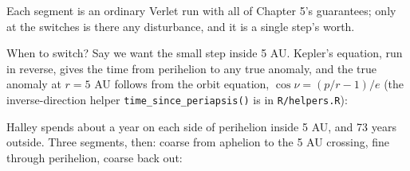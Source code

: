 \documentclass[
  10.5pt,
  letterpaper,
]{scrbook}
\newenvironment{Shaded}{\begin{snugshade}}{\end{snugshade}}
\newcommand{\AttributeTok}[1]{\textcolor[rgb]{0.00,0.00,0.00}{#1}}
\newcommand{\CommentTok}[1]{\textcolor[rgb]{0.00,0.00,0.00}{\textit{#1}}}
\newcommand{\DecValTok}[1]{\textcolor[rgb]{0.00,0.00,0.00}{#1}}
\newcommand{\FunctionTok}[1]{\textcolor[rgb]{0.00,0.00,0.00}{#1}}
\newcommand{\NormalTok}[1]{\textcolor[rgb]{0.00,0.00,0.00}{#1}}
\newcommand{\OtherTok}[1]{\textcolor[rgb]{0.00,0.00,0.00}{#1}}
\newcommand{\SpecialCharTok}[1]{\textcolor[rgb]{0.00,0.00,0.00}{#1}}
\theoremstyle{definition}
\theoremstyle{plain}
\theoremstyle{remark}
\begin{document}
Each segment is an ordinary Verlet run with all of Chapter 5's
guarantees; only at the switches is there any disturbance, and it is a
single step's worth.

When to switch? Say we want the small step inside 5 AU. Kepler's
equation, run in reverse, gives the time from perihelion to any true
anomaly, and the true anomaly at \(r = 5\) AU follows from the orbit
equation, \(\cos\nu = (p/r - 1)/e\) (the inverse-direction helper
\texttt{time\_since\_periapsis()} is in \texttt{R/helpers.R}):

\begin{Shaded}
\end{Shaded}

Halley spends about a year on each side of perihelion inside 5 AU, and
73 years outside. Three segments, then: coarse from aphelion to the 5 AU
crossing, fine through perihelion, coarse back out:
\end{document}

